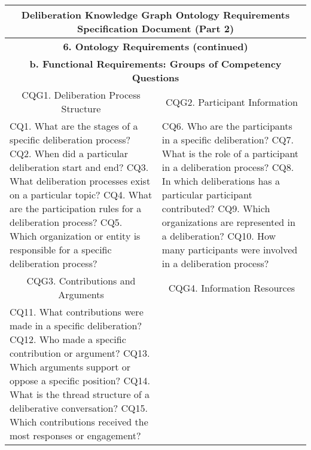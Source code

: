 \documentclass[11pt,a4paper]{article}
\begin{document}
\begin{table}[ht]
\centering
\scriptsize
\begin{tabular}{|l|l|l|l|l|l|l|l|}
\hline
\multicolumn{8}{|c|}{\textbf{Deliberation Knowledge Graph Ontology Requirements Specification Document (Part 2)}} \\
\hline
\multicolumn{8}{|c|}{\textbf{6. Ontology Requirements (continued)}} \\
\hline
\multicolumn{8}{|c|}{\textbf{b. Functional Requirements: Groups of Competency Questions}} \\
\hline
\multicolumn{4}{|c|}{CQG1. Deliberation Process Structure} & \multicolumn{4}{c|}{CQG2. Participant Information} \\
\hline
\multicolumn{4}{|p{6.8cm}|}{
CQ1. What are the stages of a specific deliberation process?\newline
CQ2. When did a particular deliberation start and end?\newline
CQ3. What deliberation processes exist on a particular topic?\newline
CQ4. What are the participation rules for a deliberation process?\newline
CQ5. Which organization or entity is responsible for a specific deliberation process?
} &
\multicolumn{4}{p{6.8cm}|}{
CQ6. Who are the participants in a specific deliberation?\newline
CQ7. What is the role of a participant in a deliberation process?\newline
CQ8. In which deliberations has a particular participant contributed?\newline
CQ9. Which organizations are represented in a deliberation?\newline
CQ10. How many participants were involved in a deliberation process?
} \\
\hline
\multicolumn{4}{|c|}{CQG3. Contributions and Arguments} & \multicolumn{4}{c|}{CQG4. Information Resources} \\
\hline
\multicolumn{4}{|p{6.8cm}|}{
CQ11. What contributions were made in a specific deliberation?\newline
CQ12. Who made a specific contribution or argument?\newline
CQ13. Which arguments support or oppose a specific position?\newline
CQ14. What is the thread structure of a deliberative conversation?\newline
CQ15. Which contributions received the most responses or engagement?\newline
}
\end{tabular}
\end{table}
\end{document}
